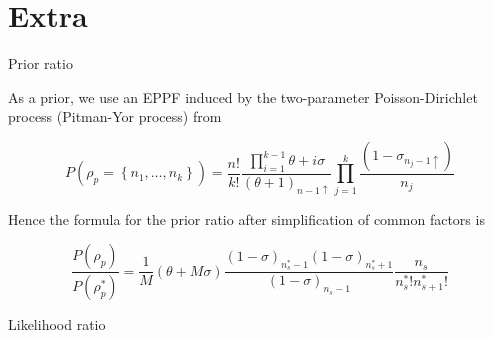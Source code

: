 \section*{Extra}


\begin{frame}{Prior ratio}

As a prior, we use an EPPF induced by the \alert{two-parameter Poisson-Dirichlet} process
(Pitman-Yor process) from \cite{martinezNonparametricChangePoint2014} 

\begin{equation*}
    P\left(\rho_p=\left\{n_1, \ldots, n_k\right\}\right)
    =
    \frac{n!}{k!} \frac{ \prod_{i=1}^{k-1}{ \theta +i\sigma} }{(\theta+1)_{n-1\uparrow}} \prod_{j=1}^{k}{\frac{(1-\sigma_{n_{j}-1\uparrow})}{n_{j}} }
\end{equation*}


Hence the formula for \alert{the prior ratio} after simplification of common factors is


\begin{equation*}
    \frac{P(\rho_p)}{P(\rho_p^{*})}
    =
    \frac{1}{M}(\theta+M\sigma)\frac{(1-\sigma)_{n_{s}^{*}-1}(1-\sigma)_{n_{s}^{*}+1}}{(1-\sigma)_{n_{s}-1}}\frac{n_{s}}{n^{*}_{s}!n^{*}_{s+1}!}
\end{equation*}


\end{frame}


\begin{frame}{Likelihood ratio}



\end{frame}


